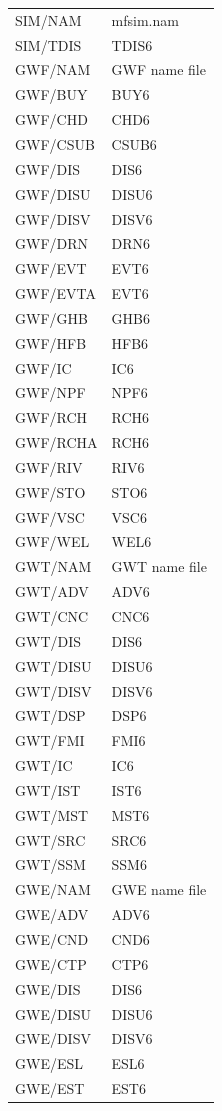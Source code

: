 \begin{longtable}{p{6cm} p{4cm}}
SIM/NAM & mfsim.nam \\
SIM/TDIS & TDIS6 \\
\hline
GWF/NAM & GWF name file \\
GWF/BUY & BUY6 \\
GWF/CHD & CHD6 \\
GWF/CSUB & CSUB6 \\
GWF/DIS & DIS6 \\
GWF/DISU & DISU6 \\
GWF/DISV & DISV6 \\
GWF/DRN & DRN6 \\
GWF/EVT & EVT6 \\
GWF/EVTA & EVT6 \\
GWF/GHB & GHB6 \\
GWF/HFB & HFB6 \\
GWF/IC & IC6 \\
GWF/NPF & NPF6 \\
GWF/RCH & RCH6 \\
GWF/RCHA & RCH6 \\
GWF/RIV & RIV6 \\
GWF/STO & STO6 \\
GWF/VSC & VSC6 \\
GWF/WEL & WEL6 \\
\hline
GWT/NAM & GWT name file \\
GWT/ADV & ADV6 \\
GWT/CNC & CNC6 \\
GWT/DIS & DIS6 \\
GWT/DISU & DISU6 \\
GWT/DISV & DISV6 \\
GWT/DSP & DSP6 \\
GWT/FMI & FMI6 \\
GWT/IC & IC6 \\
GWT/IST & IST6 \\
GWT/MST & MST6 \\
GWT/SRC & SRC6 \\
GWT/SSM & SSM6 \\
\hline
GWE/NAM & GWE name file \\
GWE/ADV & ADV6 \\
GWE/CND & CND6 \\
GWE/CTP & CTP6 \\
GWE/DIS & DIS6 \\ 
GWE/DISU & DISU6 \\
GWE/DISV & DISV6 \\
GWE/ESL & ESL6 \\
GWE/EST & EST6 \\

\end{longtable}
